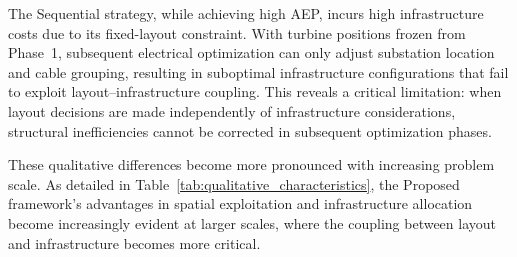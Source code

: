 \documentclass[format=sigconf,anonymous=true,review=true]{acmart}
\begin{document}
The Sequential strategy, while achieving high AEP, incurs high infrastructure costs due to its fixed-layout constraint. With turbine positions frozen from Phase~1, subsequent electrical optimization can only adjust substation location and cable grouping, resulting in suboptimal infrastructure configurations that fail to exploit layout--infrastructure coupling. This reveals a critical limitation: when layout decisions are made independently of infrastructure considerations, structural inefficiencies cannot be corrected in subsequent optimization phases.

These qualitative differences become more pronounced with increasing problem scale. As detailed in Table~\ref{tab:qualitative_characteristics}, the Proposed framework's advantages in spatial exploitation and infrastructure allocation become increasingly evident at larger scales, where the coupling between layout and infrastructure becomes more critical.
\end{document}
